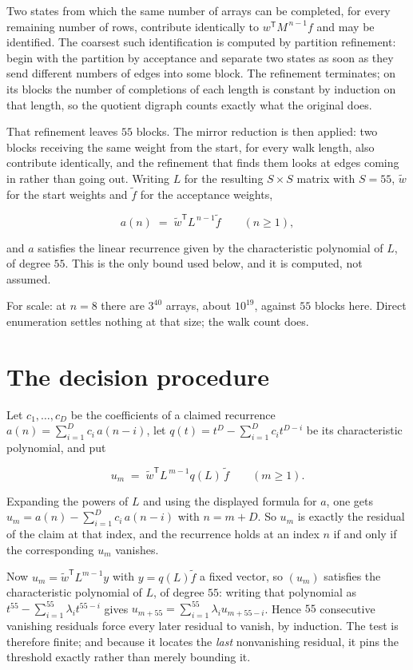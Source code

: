 \documentclass[11pt]{article}
\theoremstyle{definition}
\begin{document}
Two states from which the same number of arrays can be completed, for every remaining number of rows, contribute identically to $w^{\mathsf T}M^{\,n-1}f$ and may be identified. The coarsest such identification is computed by partition refinement: begin with the partition by acceptance and separate two states as soon as they send different numbers of edges into some block. The refinement terminates; on its blocks the number of completions of each length is constant by induction on that length, so the quotient digraph counts exactly what the original does.

That refinement leaves $55$ blocks. The mirror reduction is then applied: two blocks receiving the same weight from the start, for every walk length, also contribute identically, and the refinement that finds them looks at edges coming in rather than going out. Writing $L$ for the resulting $S \times S$ matrix with $S = 55$, $\tilde w$ for the start weights and $\tilde f$ for the acceptance weights,

\[a(n) \;=\; \tilde w^{\mathsf T} L^{\,n-1} \tilde f \qquad (n \ge 1),\]

and $a$ satisfies the linear recurrence given by the characteristic polynomial of $L$, of degree $55$. This is the only bound used below, and it is computed, not assumed.

For scale: at $n = 8$ there are $3^{40}$ arrays, about $10^{19}$, against $55$ blocks here. Direct enumeration settles nothing at that size; the walk count does.

\section{The decision procedure}

Let $c_1,\dots,c_D$ be the coefficients of a claimed recurrence $a(n) = \sum_{i=1}^{D} c_i\,a(n-i)$, let $q(t) = t^{D} - \sum_{i=1}^{D} c_i t^{D-i}$ be its characteristic polynomial, and put

\[u_m \;=\; \tilde w^{\mathsf T} L^{\,m-1} q(L)\,\tilde f \qquad (m \ge 1).\]

Expanding the powers of $L$ and using the displayed formula for $a$, one gets $u_m = a(n) - \sum_{i=1}^{D} c_i\,a(n-i)$ with $n = m + D$. So $u_m$ is exactly the residual of the claim at that index, and the recurrence holds at an index $n$ if and only if the corresponding $u_m$ vanishes.

Now $u_m = \tilde w^{\mathsf T} L^{m-1} y$ with $y = q(L)\tilde f$ a fixed vector, so $(u_m)$ satisfies the characteristic polynomial of $L$, of degree $55$: writing that polynomial as $t^{55} - \sum_{i=1}^{55} \lambda_i t^{55-i}$ gives $u_{m+55} = \sum_{i=1}^{55} \lambda_i u_{m+55-i}$. Hence $55$ consecutive vanishing residuals force every later residual to vanish, by induction. The test is therefore finite; and because it locates the {\itshape last} nonvanishing residual, it pins the threshold exactly rather than merely bounding it.
\end{document}
